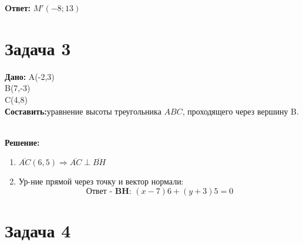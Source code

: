 \documentclass{article}
\begin{document}
\textbf{Oтвет:} $M'(-8;13)$

\section*{Задача 3}

\begin{minipage}[t]{0.45\textwidth}
   
\textbf{Дано:}
A(-2,3)\\ 
B(7,-3)\\ 
C(4,8)\\
\textbf{Составить:}уравнение высоты 
треугольника $ABC$, проходящего через вершину B.\\
\end{minipage}
\begin{minipage}[t]{0.45\textwidth}
	\vspace{-\baselineskip} %

\begin{center}
\end{center}
\end{minipage}
\\
\textbf{Решение:}
\begin{enumerate}
  \item $\overline{AC}(6,5) \Rightarrow \overline{AC} \perp \overline{BH}$
  \item Ур-ние прямой через точку и вектор нормали:
    \[
      \textbf{Ответ - BH: } (x-7)6 + (y+3)5 = 0 
    \]
\end{enumerate}


\section*{Задача 4}
\end{document}
